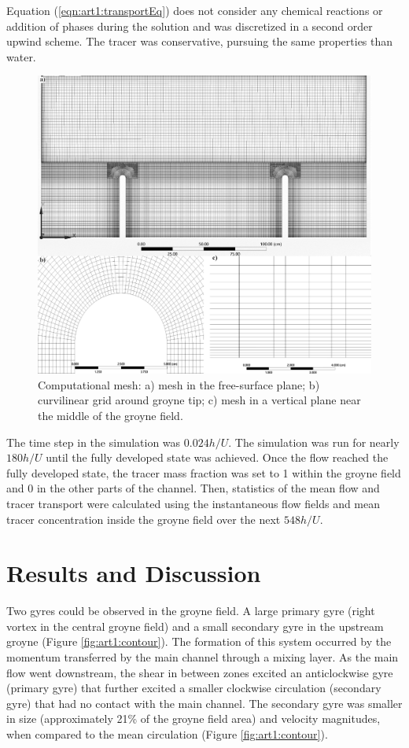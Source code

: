 Equation (\ref{eqn:art1:transportEq}) does not consider any chemical reactions or addition of phases during the solution and was discretized in a second order upwind scheme. The tracer was conservative, pursuing the same properties than water.

\begin{figure}[!ht]
\centering
\includegraphics[width=\linewidth]{../images/art1/imgMassExchange2.png}
\caption{Computational mesh: a) mesh in the free-surface plane; b) curvilinear grid around groyne tip; c) mesh in a vertical plane near the middle of the groyne field.}
\label{fig:art1:mesh}
\end{figure}

The time step in the simulation was $0.024h/U$. The simulation was run for nearly $180h/U$ until the fully developed state was achieved. Once the flow reached the fully developed state, the tracer mass fraction was set to 1 within the groyne field and 0 in the other parts of the channel. Then, statistics of the mean flow and tracer transport were calculated using the instantaneous flow fields and mean tracer concentration inside the groyne field over the next $548h/U$.

\section{Results and Discussion}
Two gyres could be observed in the groyne field. A large primary gyre (right vortex in the central groyne field) and a small secondary gyre in the upstream groyne (Figure \ref{fig:art1:contour}). The formation of this system occurred by the momentum transferred by the main channel through a mixing layer. As the main flow went downstream, the shear in between zones excited an anticlockwise gyre (primary gyre) that further excited a smaller clockwise circulation (secondary gyre) that had no contact with the main channel. The secondary gyre was smaller in size (approximately 21\% of the groyne field area) and velocity magnitudes, when compared to the mean circulation (Figure \ref{fig:art1:contour}).

